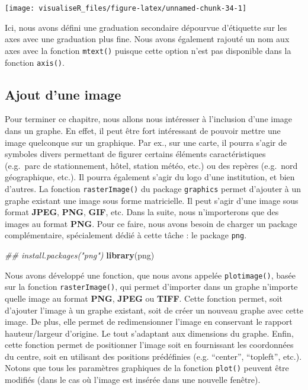 \documentclass[]{article}
\newenvironment{Shaded}{\begin{snugshade}}{\end{snugshade}}
\newcommand{\CommentTok}[1]{\textcolor[rgb]{0.56,0.35,0.01}{\textit{#1}}}
\newcommand{\KeywordTok}[1]{\textcolor[rgb]{0.13,0.29,0.53}{\textbf{#1}}}
\newcommand{\NormalTok}[1]{#1}
\begin{document}
\begin{center}\texttt{[image: visualiseR\_files/figure-latex/unnamed-chunk-34-1]} \end{center}

Ici, nous avons défini une graduation secondaire dépourvue d'étiquette sur les axes avec une graduation plus fine. Nous avons également rajouté un nom aux axes avec la fonction \texttt{mtext()} puisque cette option n'est pas disponible dans la fonction \texttt{axis()}.

\hypertarget{ajout-dune-image}{%
\subsection{Ajout d'une image}\label{ajout-dune-image}}

Pour terminer ce chapitre, nous allons nous intéresser à l'inclusion d'une image dans un graphe. En effet, il peut être fort intéressant de pouvoir mettre une image quelconque sur un graphique. Par ex., sur une carte, il pourra s'agir de symboles divers permettant de figurer certains éléments caractéristiques (e.g.~parc de stationnement, hôtel, station météo, etc.) ou des repères (e.g.~nord géographique, etc.). Il pourra également s'agir du logo d'une institution, et bien d'autres.
La fonction \texttt{rasterImage()} du package \texttt{graphics} permet d'ajouter à un graphe existant une image sous forme matricielle. Il peut s'agir d'une image sous format \textbf{JPEG}, \textbf{PNG}, \textbf{GIF}, etc. Dans la suite, nous n'importerons que des images au format \textbf{PNG}. Pour ce faire, nous avons besoin de charger un package complémentaire, spécialement dédié à cette tâche : le package \texttt{png}.

\begin{Shaded}
\begin{Highlighting}[]
\CommentTok{## install.packages("png")}
\KeywordTok{library}\NormalTok{(png)}
\end{Highlighting}
\end{Shaded}

Nous avons développé une fonction, que nous avons appelée \texttt{plotimage()}, basée sur la fonction \texttt{rasterImage()}, qui permet d'importer dans un graphe n'importe quelle image au format \textbf{PNG}, \textbf{JPEG} ou \textbf{TIFF}. Cette fonction permet, soit d'ajouter l'image à un graphe existant, soit de créer un nouveau graphe avec cette image. De plus, elle permet de redimensionner l'image en conservant le rapport hauteur/largeur d'origine. Le tout s'adaptant aux dimensions du graphe. Enfin, cette fonction permet de positionner l'image soit en fournissant les coordonnées du centre, soit en utilisant des positions prédéfinies (e.g. ``center'', ``topleft'', etc.). Notons que tous les paramètres graphiques de la fonction \texttt{plot()} peuvent être modifiés (dans le cas où l'image est insérée dans une nouvelle fenêtre).
\end{document}
